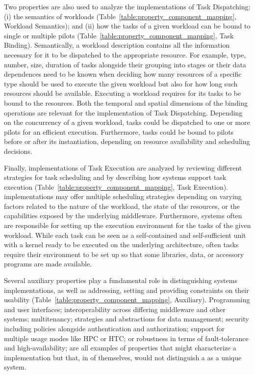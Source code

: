 \documentclass{sig-alternate}
\begin{document}
Two properties are also used to analyze the implementations of Task
Dispatching: (i) the semantics of workloads
(Table~\ref{table:property_component_mapping}, Workload Semantics); and (ii)
how the tasks of a given workload can be bound to single or multiple pilots
(Table~\ref{table:property_component_mapping}, Task Binding). Semantically, a
workload description contains all the information necessary for it to be
dispatched to the appropriate resource. For example, type, number, size,
duration of tasks alongside their grouping into stages or their data
dependences need to be known when deciding how many resources of a specific
type should be used to execute the given workload but also for how long such
resources should be available. Executing a workload requires for its tasks to
be bound to the resources. Both the temporal and spatial dimensions of the
binding operations are relevant for the implementation of Task Dispatching.
Depending on the concurrency of a given workload, tasks could be dispatched to
one or more pilots for an efficient execution. Furthermore, tasks could be
bound to pilots before or after its instantiation, depending on resource
availability and scheduling decisions.

Finally, implementations of Task Execution are analyzed by reviewing different
strategies for task scheduling and by describing how \pilot systems support
task execution (Table~\ref{table:property_component_mapping}, Task Execution).
\pilot implementations may offer multiple scheduling strategies depending on
varying factors related to the nature of the workload, the state of the
resources, or the capabilities exposed by the underlying middleware.
Furthermore, \pilot systems often are responsible for setting up the execution
environment for the tasks of the given workload. While each task can be seen as
a self-contained and self-sufficient unit with a kernel ready to be executed on
the underlying architecture, often tasks require their environment to be set up
so that some libraries, data, or accessory programs are made available.

Several auxiliary properties play a fundamental role in distinguishing
\pilot systems implementations, as well as addressing, setting and providing
constraints on their usability (Table~\ref{table:property_component_mapping},
Auxiliary). Programming and user interfaces; interoperability across differing
middleware and other \pilot systems; multitenancy; strategies and abstractions
for data management; security including policies alongside authentication and
authorization; support for multiple usage modes like HPC or HTC; or robustness
in terms of fault-tolerance and high-availability; are all examples of
properties that might characterize a \pilot implementation but that, in of
themselves, would not distinguish a \pilot as a unique system.
\end{document}
